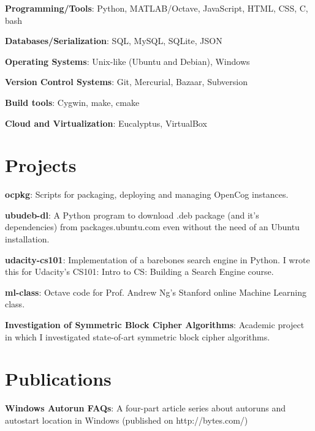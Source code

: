 \documentclass[margin,line]{resume}
\begin{document}
\begin{resume}
    \begin{list2}
	\item \textbf{Programming/Tools}: \hspace{11.8mm} Python, MATLAB/Octave, JavaScript, HTML, CSS, C, bash
	\item \textbf{Databases/Serialization}: \hspace{5.7mm} SQL, MySQL, SQLite,	JSON
	\item \textbf{Operating Systems}: \hspace{13.8mm} Unix-like (Ubuntu and Debian), Windows
	\item \textbf{Version Control Systems}: \hspace{3.5mm} Git, Mercurial, Bazaar, Subversion
	\item \textbf{Build tools}: \hspace{28mm} Cygwin, make, cmake
	\item \textbf{Cloud and Virtualization}: \hspace{3mm} Eucalyptus, VirtualBox
	\end{list2}

    \section{\mysidestyle Projects} 
	\begin{list2}
	\item \textbf{ocpkg}: Scripts for packaging, deploying and managing OpenCog instances.
	\item \textbf{ubudeb-dl}: A Python program to download .deb package (and it's dependencies) from packages.ubuntu.com even without the need of an Ubuntu installation.
	\item \textbf{udacity-cs101}: Implementation of a barebones search engine in Python. I wrote this for Udacity's CS101: Intro to CS: Building a Search Engine course.
	\item \textbf{ml-class}: Octave code for Prof. Andrew Ng's Stanford online Machine Learning class.
	\item \textbf{Investigation of Symmetric Block Cipher Algorithms}: Academic project in which I investigated state-of-art symmetric block cipher algorithms.
    \end{list2}

	\section{\mysidestyle Publications}
	\begin{list2}
	\item \textbf{Windows Autorun FAQs}: A four-part article series about autoruns and autostart location in Windows (published on http://bytes.com/)
	\end{list2}


\end{resume}
\end{document}
